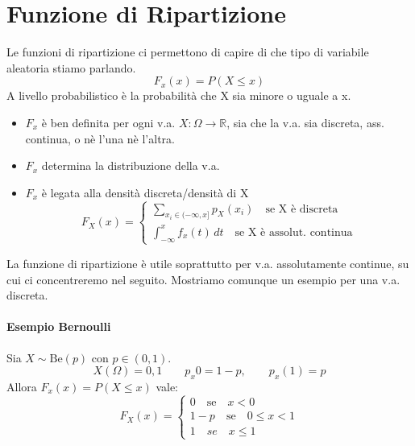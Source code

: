 \documentclass[12pt, a4paper, openany]{book}
\begin{document}
\section{Funzione di Ripartizione}
Le funzioni di ripartizione ci permettono di capire di che tipo di variabile aleatoria
stiamo parlando.
\begin{equation*}
    F_x (x) = P(X \leq x)
\end{equation*}
A livello probabilistico è la probabilità che X sia minore o uguale a x.
\begin{itemize}
    \item $F_x$ è ben definita per ogni v.a. $X: \Omega \rightarrow \mathbb{R}$, sia che la v.a.
    sia discreta, ass. continua, o nè l'una nè l'altra.
    \item $F_x$ determina la distribuzione della v.a.
    \item $F_x$ è legata alla densità discreta/densità di X
    \begin{equation*}
        F_X(x) = 
        \begin{cases}
        \sum_{x_i \in (- \infty, x]} p_X (x_i) \quad \text{se X è discreta}\\
        \int_{-\infty}^{x} f_x(t)\,dt \quad \text{se X è assolut. continua} 
        \end{cases}
    \end{equation*}
\end{itemize}
La funzione di ripartizione è utile soprattutto per v.a. assolutamente continue, su cui
ci concentreremo nel seguito. Mostriamo comunque un esempio per una v.a. discreta.
\paragraph*{Esempio Bernoulli} Sia $X \sim \text{Be}(p)$ con $p \in (0,1)$.
\begin{equation*}
    X(\Omega) = {0, 1} \qquad p_x{0}=1-p, \qquad p_x(1) = p
\end{equation*}
Allora $F_x(x) = P(X \leq x)$ vale:
\begin{equation*}
    F_X(x) =
    \begin{cases}
        0 \quad \text{se} \quad x < 0 \\
        1-p \quad \text{se} \quad 0 \leq x < 1 \\
        1 \quad se \quad x \leq 1
    \end{cases}
\end{equation*}
\end{document}
